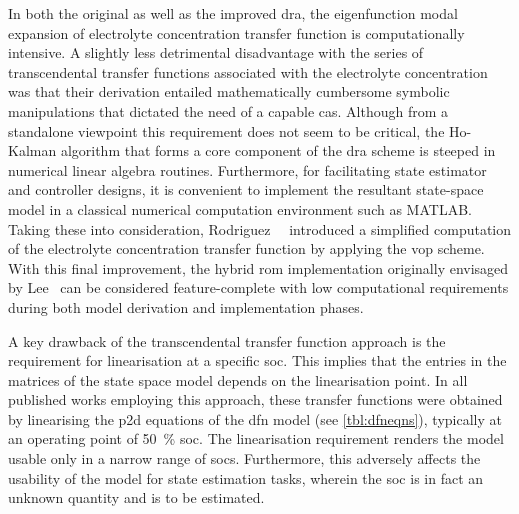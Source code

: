 

\addlines[0.5]
In both the original as well  as the improved \gls{dra}, the eigenfunction modal
expansion  of electrolyte  concentration  transfer  function is  computationally
intensive.  A  slightly  less  detrimental   disadvantage  with  the  series  of
transcendental transfer functions associated  with the electrolyte concentration
was   that  their   derivation  entailed   mathematically  cumbersome   symbolic
manipulations that  dictated the need  of a  capable \gls{cas}. Although  from a
standalone  viewpoint  this  requirement  does  not seem  to  be  critical,  the
\mbox{Ho-Kalman}  algorithm  that  forms  a  core  component  of  the  \gls{dra}
scheme  is  steeped  in  numerical linear  algebra  routines.  Furthermore,  for
facilitating  state  estimator  and  controller designs,  it  is  convenient  to
implement the resultant  state-space model in a  classical numerical computation
environment   such  as   \textsc{MATLAB}.  Taking   these  into   consideration,
Rodriguez~\etal{}~\cite{Rodriguez2017}  introduced a  simplified computation  of
the  electrolyte  concentration  transfer  function by  applying  the  \gls{vop}
scheme.  With  this  final  improvement,  the  hybrid  \gls{rom}  implementation
originally envisaged by Lee~\etal{} can  be considered feature-complete with low
computational  requirements  during  both model  derivation  and  implementation
phases.


A  key  drawback  of  the  transcendental  transfer  function  approach  is  the
requirement for  linearisation at  a specific \gls{soc}.  This implies  that the
entries in  the matrices of the  state space model depends  on the linearisation
point. In all published works  employing this approach, these transfer functions
were  obtained by  linearising the  \gls{p2d} equations  of the  \gls{dfn} model
(see \cref{tbl:dfneqns}), typically  at an operating point  of \SI{50}{\percent}
\gls{soc}.  The linearisation  requirement renders  the model  usable only  in a
narrow range of  \glspl{soc}. Furthermore, this adversely  affects the usability
of the  model for state  estimation tasks, wherein the  \gls{soc} is in  fact an
unknown quantity and is to be estimated.


